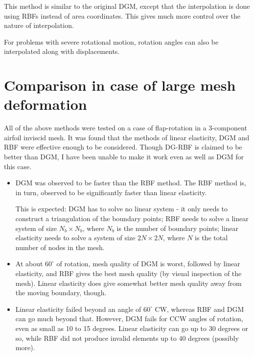 \documentclass{article}
\begin{document}
This method is similar to the original DGM, except that the interpolation is done using RBFs instead of area coordinates. This gives much more control over the nature of interpolation.

For problems with severe rotational motion, rotation angles can also be interpolated along with displacements.
 

\section{Comparison in case of large mesh deformation}
All of the above methods were tested on a case of flap-rotation in a 3-component airfoil inviscid mesh. It was found that the methods of linear elasticity, DGM and RBF were effective enough to be considered. Though DG-RBF is claimed to be better than DGM, I have been unable to make it work even as well as DGM for this case.
\begin{itemize}
\item DGM was observed to be faster than the RBF method. The RBF method is, in turn, observed to be significantly faster than linear elasticity. 

This is expected: DGM has to solve no linear system - it only needs to construct a triangulation of the boundary points; RBF needs to solve a linear system of size $N_b \times N_b$, where $N_b$ is the number of boundary points; linear elasticity needs to solve a system of size $2N \times 2N$, where $N$ is the total number of nodes in the mesh. 

\item At about $60^\circ$ of rotation, mesh quality of DGM is worst, followed by linear elasticity, and RBF gives the best mesh quality (by visual inspection of the mesh). Linear elasticity does give somewhat better mesh quality away from the moving boundary, though.

\item Linear elasticity failed beyond an angle of $60^\circ$ CW, whereas RBF and DGM can go much beyond that. However, DGM fails for CCW angles of rotation, even as small as 10 to 15 degrees. Linear elasticity can go up to 30 degrees or so, while RBF did not produce invalid elements up to 40 degrees (possibly more).
\end{itemize}
 
\end{document}
